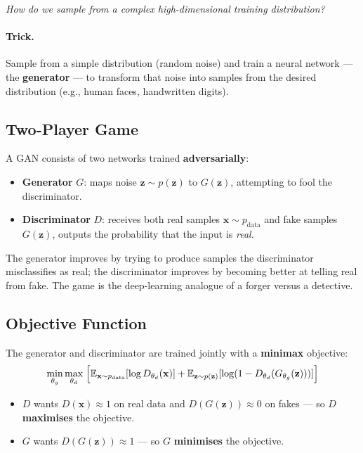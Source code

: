 \documentclass[11pt,a4paper]{article}
\theoremstyle{definition}
\theoremstyle{plain}
\theoremstyle{remark}
\begin{document}
\textit{How do we sample from a complex high-dimensional training distribution?}

\paragraph{Trick.} Sample from a simple distribution (random noise) and train a neural network --- the \textbf{generator} --- to transform that noise into samples from the desired distribution (e.g., human faces, handwritten digits).

\subsection{Two-Player Game}

A GAN consists of two networks trained \textbf{adversarially}:
\begin{itemize}
    \item \textbf{Generator} $G$: maps noise $\mathbf{z} \sim p(\mathbf{z})$ to $G(\mathbf{z})$, attempting to fool the discriminator.
    \item \textbf{Discriminator} $D$: receives both real samples $\mathbf{x} \sim p_{\text{data}}$ and fake samples $G(\mathbf{z})$, outputs the probability that the input is \emph{real}.
\end{itemize}

The generator improves by trying to produce samples the discriminator misclassifies as real; the discriminator improves by becoming better at telling real from fake. The game is the deep-learning analogue of a forger versus a detective.

\subsection{Objective Function}

The generator and discriminator are trained jointly with a \textbf{minimax} objective:
\[
    \min_{\theta_g} \max_{\theta_d} \;\Bigl[
        \mathbb{E}_{\mathbf{x} \sim p_{\text{data}}}[\log D_{\theta_d}(\mathbf{x})]
        + \mathbb{E}_{\mathbf{z} \sim p(\mathbf{z})}[\log(1 - D_{\theta_d}(G_{\theta_g}(\mathbf{z})))]
    \Bigr]
\]
\begin{itemize}
    \item $D$ wants $D(\mathbf{x}) \approx 1$ on real data and $D(G(\mathbf{z})) \approx 0$ on fakes --- so $D$ \textbf{maximises} the objective.
    \item $G$ wants $D(G(\mathbf{z})) \approx 1$ --- so $G$ \textbf{minimises} the objective.
\end{itemize}
\end{document}
